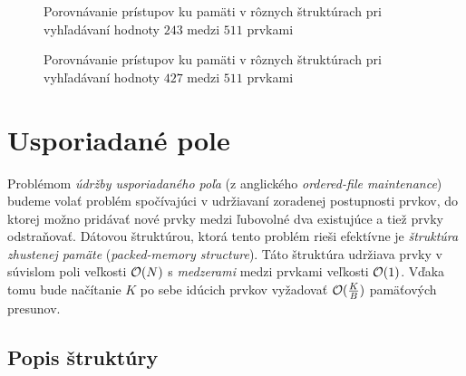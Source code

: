 \begin{sidewaysfigure}
    \centering
    \caption{Porovnávanie prístupov ku pamäti v rôznych štruktúrach pri vyhľadávaní hodnoty $243$ medzi $511$ prvkami}
    \label{fig:search_comparison1}

    \vspace*{2cm} %
        
    \caption{Porovnávanie prístupov ku pamäti v rôznych štruktúrach pri vyhľadávaní hodnoty $427$ medzi $511$ prvkami}
    \label{fig:search_comparison2}
\end{sidewaysfigure}


\section{Usporiadané pole} \label{sec:orderedfile}

Problémom \emph{údržby usporiadaného poľa} (z anglického \emph{ordered-file maintenance}) budeme volať problém spočívajúci v udržiavaní zoradenej postupnosti prvkov, do ktorej možno pridávať nové prvky medzi ľubovolné dva existujúce a tiež prvky odstraňovať. Dátovou štruktúrou, ktorá tento problém rieši efektívne je \emph{štruktúra zhustenej pamäte} (\emph{packed-memory structure}). Táto štruktúra udržiava prvky v súvislom poli veľkosti $\mathcal{O}(N)$ s \emph{medzerami} medzi prvkami veľkosti $\mathcal{O}(1)$. Vďaka tomu bude načítanie $K$ po sebe idúcich prvkov vyžadovať $\mathcal{O}(\frac{K}{B})$ pamäťových presunov.

\subsection{Popis štruktúry} \label{sec:of-desc}


